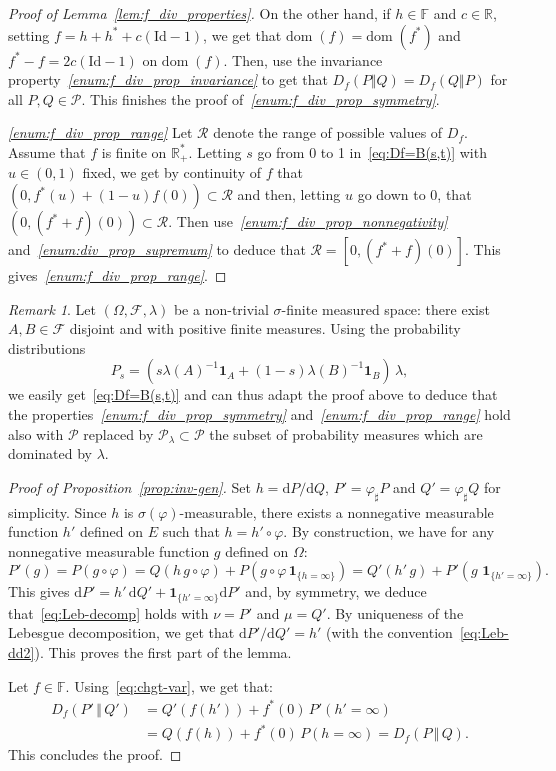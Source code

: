 \documentclass[12pt]{article}
\newcommand{\cf}{{\mathcal F}}
\newcommand{\cp}{{\mathcal P}}
\newcommand{\crr}{{\mathcal R}}
\newcommand{\F}{{\mathbb F}}
\newcommand{\R}{{\mathbb R}}
\newcommand{\dom}{{\mathrm{dom}}\;}
\newcommand{\id}{\mathrm{Id}}
\newcommand{\ind}{\mathbf{1}}
\newcommand{\rd}{\mathrm{d}}
\theoremstyle{plain}
\theoremstyle{remark}
\newtheorem{rem}{Remark}
\begin{document}
\begin{proof}[Proof of Lemma~\ref{lem:f_div_properties}]
 On the other hand, if $h\in \F$ and $c\in \R$, setting
$f=h+h^* + c(\id-1)$, we get that $\dom(f)=\dom(f^*)$ and
 $f^* -f = 2 c(\id-1)$ on $\dom(f)$. Then, use the invariance property{\it ~\ref{enum:f_div_prop_invariance}} to get that $D_f(P  \Vert Q)
 = D_{f}(Q\Vert  P)$ for all $P,Q\in  \cp$.
 This finishes the proof of{\it ~\ref{enum:f_div_prop_symmetry}}.

{\it \ref{enum:f_div_prop_range}} Let $\crr$ denote the range of possible values of $D_f$. Assume that $f$ is finite on
$\R_+^*$.
Letting $s$ go from 0 to 1 in~\eqref{eq:Df=B(s,t)} with $u\in (0, 1)$
fixed, we get by continuity of $f$ that $(0, f^* (u) + (1-u) f(0))\subset \crr$
and then, letting $u$ go down to $0$,  that $(0, (f^*+f)(0))\subset \crr$.
Then use{\it ~\ref{enum:f_div_prop_nonnegativity}}
and{\it ~\ref{enum:div_prop_supremum}} to deduce that
$\crr=[0,(f^*+f)(0)]$. This gives{\it ~\ref{enum:f_div_prop_range}}. %
\end{proof}


\begin{rem}
  \label{rem:PL-ext}
  Let $(\Omega, \cf, \lambda)$ be a non-trivial $\sigma$-finite measured
  space: there  exist $A,  B\in \cf$ disjoint  and with  positive finite
  measures.    Using    the    probability    distributions
  $$
  P_s=\left(s \lambda(A)^{-1} \ind _A + (1-s) \lambda(B)^{-1} \ind _{B}
  \right)\,  \lambda,
  $$ we  easily get~\eqref{eq:Df=B(s,t)}  and can  thus
  adapt   the   proof  above  to    deduce that the
  properties{\it ~\ref{enum:f_div_prop_symmetry}}
  and{\it ~\ref{enum:f_div_prop_range}}  hold  also  with  $\cp$  replaced  by
  $\cp_\lambda\subset\cp$ the  subset of probability measures  which are
  dominated by $\lambda$.
\end{rem}

\begin{proof}[Proof of Proposition~\ref{prop:inv-gen}]
  Set   $h=   \rd    P/\rd   Q$,
    $P' = \varphi_ \sharp P $  and $Q' = \varphi_ \sharp Q$
   for   simplicity.     Since   $h$   is
  $\sigma(\varphi)$-measurable,  there exists  a nonnegative  measurable
  function  $h'$  defined on  $E$  such  that $h=h'\circ  \varphi$.   By
  construction,  we have  for  any nonnegative  measurable function  $g$
  defined on $\Omega$:
\[
  P'(g)=  P(g\circ \varphi)
  =Q(h\, g\circ \varphi) + P( g\circ \varphi \, \ind_{\{h=\infty \}})
  =  Q' (h' \, g) + P'(g \,  \, \ind_{\{h'=\infty \}}).
\]
This gives $\rd P'= h'\, \rd Q' + \ind_{\{h'=\infty \}}\rd P'$ and, by
symmetry, we deduce that~\eqref{eq:Leb-decomp} holds with $\nu=P'$ and
$\mu=Q'$. By uniqueness of the Lebesgue decomposition, we get that  $
\rd P'/ \rd Q'=h'$ (with the
convention~\eqref{eq:Leb-dd2}). This proves the first part of the lemma.


Let $f\in \F$. Using~\eqref{eq:chgt-var}, we get that:
\begin{align*}
D_f( P' \, \Vert \,  Q')
 & = Q'(f(h'))+ f^*(0) \, P' \left( h' =\infty \right)\\
&  = Q(f(h)) + f^*(0) \, P \left( h =\infty \right)
= D_f( P \, \Vert \,  Q).
\end{align*}
This concludes the proof. %
\end{proof}
\end{document}
